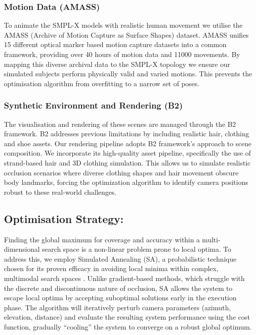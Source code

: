 \subsubsection{Motion Data (AMASS)}
\cite{mahmood2019amass}
To animate the SMPL-X models with realistic human movement we utilise the AMASS (Archive of Motion Capture as Surface Shapes) dataset. AMASS unifies 15 different optical marker based motion capture datasets into a common framework, providing over 40 hours of motion data and 11000 movements. By mapping this diverse archival data to the SMPL-X topology we ensure our simulated subjects perform physically valid and varied motions. This prevents the optimisation algorithm from overfitting to a narrow set of poses.

\subsubsection{Synthetic Environment and Rendering (B2)}
The visualisation and rendering of these scenes are managed through the B2 framework. B2 addresses previous limitations by including realistic hair, clothing and shoe assets. Our rendering pipeline adopts B2 framework's approach to scene composition. We incorporate its high-quality asset pipeline, specifically the use of strand-based hair and 3D clothing simulation. This allows us to simulate realistic occlusion scenarios where diverse clothing shapes and hair movement obscure body landmarks, forcing the optimization algorithm to identify camera positions robust to these real-world challenges.

\subsection{Optimisation Strategy:}
Finding the global maximum for coverage and accuracy within a multi-dimensional search space is a non-linear problem prone to local optima. To address this, we employ Simulated Annealing (SA), a probabilistic technique chosen for its proven efficacy in avoiding local minima within complex, multimodal search spaces \cite{rahimian2016optimal}. Unlike gradient-based methods, which struggle with the discrete and discontinuous nature of occlusion, SA allows the system to escape local optima by accepting suboptimal solutions early in the execution phase. The algorithm will iteratively perturb camera parameters (azimuth, elevation, distance) and evaluate the resulting system performance using the cost function, gradually ``cooling'' the system to converge on a robust global optimum. 

